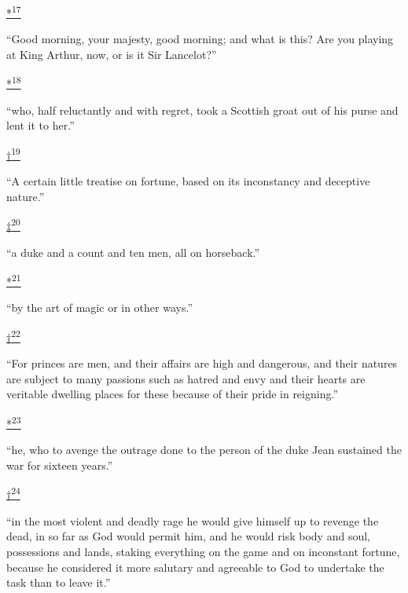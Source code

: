 \protect\hypertarget{23_NOTES.xhtmlux5cux23id_2278}{\protect\hyperlink{08_Chapter_One__THE_PASSIONATE_INTE.xhtmlux5cux23id_2279}{*\textsuperscript{17}}}
``Good morning, your majesty, good morning; and what is this? Are you
playing at King Arthur, now, or is it Sir Lancelot?''

\protect\hypertarget{23_NOTES.xhtmlux5cux23id_2282}{\protect\hyperlink{08_Chapter_One__THE_PASSIONATE_INTE.xhtmlux5cux23id_2283}{*\textsuperscript{18}}}
``who, half reluctantly and with regret, took a Scottish groat out of
his purse and lent it to her.''

\protect\hypertarget{23_NOTES.xhtmlux5cux23id_2285}{\protect\hyperlink{08_Chapter_One__THE_PASSIONATE_INTE.xhtmlux5cux23id_2281}{†\textsuperscript{19}}}
``A certain little treatise on fortune, based on its inconstancy and
deceptive nature.''

\protect\hypertarget{23_NOTES.xhtmlux5cux23id_2289}{\protect\hyperlink{08_Chapter_One__THE_PASSIONATE_INTE.xhtmlux5cux23id_2284}{‡\textsuperscript{20}}}
``a duke and a count and ten men, all on horseback.''

\protect\hypertarget{23_NOTES.xhtmlux5cux23id_2287}{\protect\hyperlink{08_Chapter_One__THE_PASSIONATE_INTE.xhtmlux5cux23id_2288}{*\textsuperscript{21}}}
``by the art of magic or in other ways.''

\protect\hypertarget{23_NOTES.xhtmlux5cux23id_2291}{\protect\hyperlink{08_Chapter_One__THE_PASSIONATE_INTE.xhtmlux5cux23id_2286}{†\textsuperscript{22}}}
``For princes are men, and their affairs are high and dangerous, and
their natures are subject to many passions such as hatred and envy and
their hearts are veritable dwelling places for these because of their
pride in reigning.''

\protect\hypertarget{23_NOTES.xhtmlux5cux23id_2292}{\protect\hyperlink{08_Chapter_One__THE_PASSIONATE_INTE.xhtmlux5cux23id_2290}{*\textsuperscript{23}}}
``he, who to avenge the outrage done to the person of the duke Jean
sustained the war for sixteen years.''

\protect\hypertarget{23_NOTES.xhtmlux5cux23id_2295}{\protect\hyperlink{08_Chapter_One__THE_PASSIONATE_INTE.xhtmlux5cux23id_2296}{†\textsuperscript{24}}}
``in the most violent and deadly rage he would give himself up to
revenge the dead, in so far as God would permit him, and he would risk
body and soul, possessions and lands, staking everything on the game and
on inconstant fortune, because he considered it more salutary and
agreeable to God to undertake the task than to leave it.''

